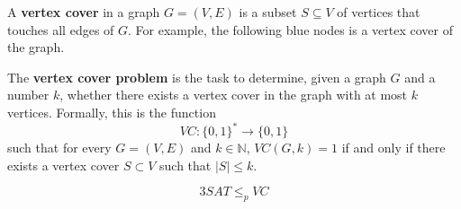   \begin{definition}
    \label{def:vertex-cover}
  A \textbf{vertex cover} in a graph $G = (V, E)$ is a subset $S \subseteq V$ of vertices that touches all edges of $G$. For example, the following blue nodes is a vertex cover of the graph. 
  \begin{center}
  \end{center}

  The \textbf{vertex cover problem} is the task to determine, given a graph $G$ and a number $k$, whether there exists a vertex cover in the graph with at most $k$ vertices. Formally, this is the function 
  \begin{equation}
    VC: \{0,1\}^* \to \{0,1\}
  \end{equation}
  such that for every $G = (V, E)$ and $k \in \mathbb{N}$, $VC(G, k) = 1$ if and only if there exists a vertex cover $S \subset V$ such that $|S| \leq k$. 
  \end{definition}

  \begin{theorem}
    \label{thm:3satleqpvc}
  \begin{equation}
    3SAT \leq_p VC
  \end{equation}
  \end{theorem}

